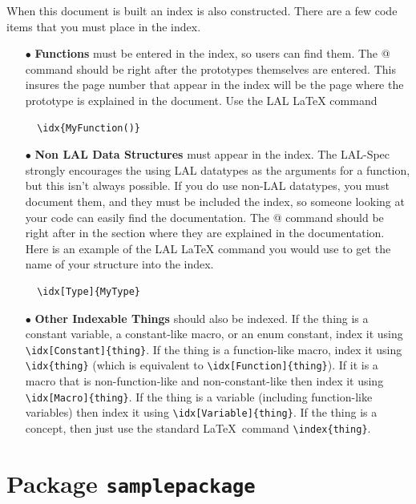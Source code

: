 \documentclass[oneside]{book}
\begin{document}
When this  document is built an index is also constructed. There are a few
code items that you must place in the index.
\begin{itemize}
  \item[$\bullet$] {\bf Functions} must be entered in the index, so
   users can find them. The \verb@\idx{}@ command should be right
   after the prototypes themselves are entered.  This insures the page
   number that appear in the index will be the page where the
   prototype is explained in the document.
   Use the LAL {\LaTeX} command
  \begin{verbatim}
  \idx{MyFunction()}
  \end{verbatim}
  \vspace*{-0.041in}
  \item[$\bullet$] {\bf Non LAL Data Structures}  must appear in the index.
  The LAL-Spec strongly encourages the using  LAL datatypes as the
  arguments for a function, but this isn't always possible. If you do
  use non-LAL datatypes, you must document them, and they must be
  included the index, so someone looking at your code can easily find
  the documentation.  The \verb@\idx[Type]{}@ command should be right after
  in the section where they are explained in the documentation.  
  Here is an example of the LAL {\LaTeX} command you would use to get the
  name of your structure into the index.
  \begin{verbatim}
  \idx[Type]{MyType}
  \end{verbatim}
  \vspace*{-0.041in}
  \item[$\bullet$] {\bf Other Indexable Things} should also be indexed.
  If the thing is a constant variable, a constant-like macro, or an enum
  constant, index it using \verb&\idx[Constant]{thing}&.  If the thing is
  a function-like macro, index it using \verb&\idx{thing}& (which is equivalent
  to \verb&\idx[Function]{thing}&).  If it is a macro that is non-function-like
  and non-constant-like then index it using \verb&\idx[Macro]{thing}&.  If the
  thing is a variable (including function-like variables) then index it using
  \verb&\idx[Variable]{thing}&.  If the thing is a concept, then just use the
  standard \LaTeX\ command \verb&\index{thing}&.
\end{itemize}


\chapter{Package {\texttt {samplepackage}}}
\label{c:SamplePackage}
\end{document}
